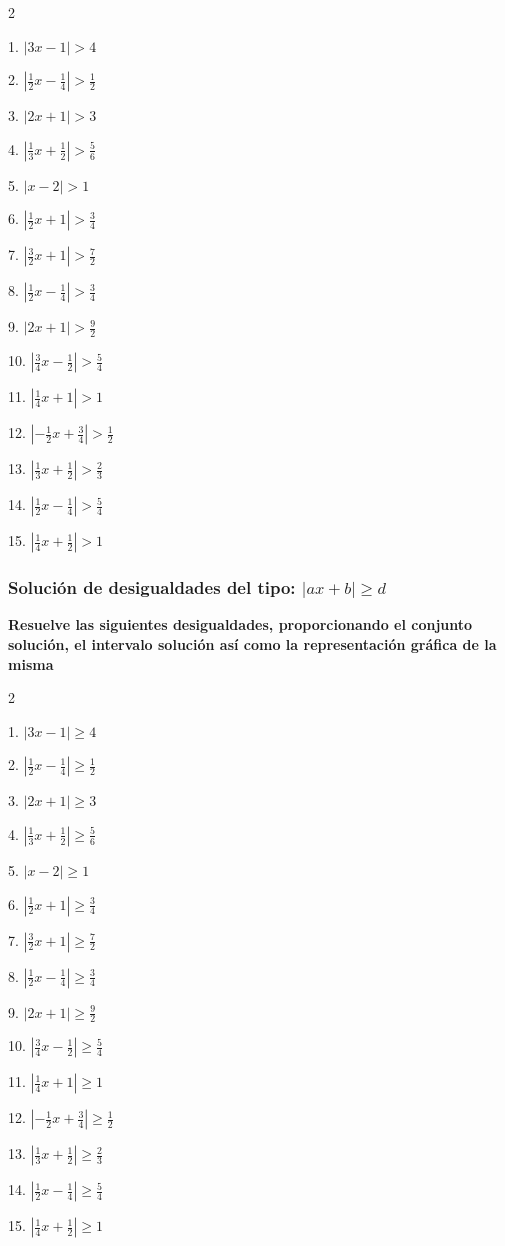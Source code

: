 \documentclass[12pt]{article}
\begin{document}
\begin{multicols}{2}

1. $|3x-1|>4$

2. $|\frac{1}{2}x-\frac{1}{4}|>\frac{1}{2}$

3. $|2x+1|>3$

4. $|\frac{1}{3}x+\frac{1}{2}|>\frac{5}{6}$

5. $|x-2|>1$

6. $|\frac{1}{2}x+1|>\frac{3}{4}$

7. $|\frac{3}{2}x+1|>\frac{7}{2}$

8. $|\frac{1}{2}x-\frac{1}{4}|>\frac{3}{4}$

9. $|2x+1|>\frac{9}{2}$

10. $|\frac{3}{4}x-\frac{1}{2}|>\frac{5}{4}$

11. $|\frac{1}{4}x+1|>1$

12. $|-\frac{1}{2}x+\frac{3}{4}|>\frac{1}{2}$

13. $|\frac{1}{3}x+\frac{1}{2}|>\frac{2}{3}$

14. $|\frac{1}{2}x-\frac{1}{4}|>\frac{5}{4}$

15. $|\frac{1}{4}x+\frac{1}{2}|>1$

\end{multicols}

\subsubsection{\texorpdfstring{Solución de desigualdades del tipo:
\(|ax+b| \geq d\)}{Solución de desigualdades del tipo: \textbar ax+b\textbar{} \textbackslash geq d}}\label{soluciuxf3n-de-desigualdades-del-tipo-axb-geq-d}
\textbf{Resuelve las siguientes desigualdades, proporcionando el
conjunto solución, el intervalo solución así como la representación
gráfica de la misma}

\begin{multicols}{2}

1. $|3x-1|\geq 4$

2. $|\frac{1}{2}x-\frac{1}{4}|\geq\frac{1}{2}$

3. $|2x+1|\geq 3$

4. $|\frac{1}{3}x+\frac{1}{2}|\geq\frac{5}{6}$

5. $|x-2|\geq 1$

6. $|\frac{1}{2}x+1|\geq\frac{3}{4}$

7. $|\frac{3}{2}x+1|\geq\frac{7}{2}$

8. $|\frac{1}{2}x-\frac{1}{4}|\geq\frac{3}{4}$

9. $|2x+1|\geq\frac{9}{2}$

10. $|\frac{3}{4}x-\frac{1}{2}|\geq\frac{5}{4}$

11. $|\frac{1}{4}x+1|\geq 1$

12. $|-\frac{1}{2}x+\frac{3}{4}|\geq\frac{1}{2}$

13. $|\frac{1}{3}x+\frac{1}{2}|\geq\frac{2}{3}$

14. $|\frac{1}{2}x-\frac{1}{4}|\geq\frac{5}{4}$

15. $|\frac{1}{4}x+\frac{1}{2}|\geq 1$

\end{multicols}
\end{document}
